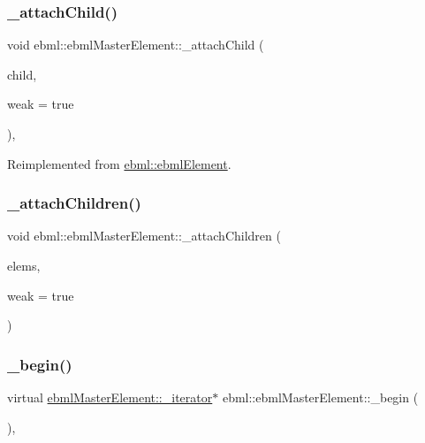 \subsubsection{\texorpdfstring{\+\_\+attach\+Child()}{\_attachChild()}}
{\footnotesize\ttfamily void ebml\+::ebml\+Master\+Element\+::\+\_\+attach\+Child (\begin{DoxyParamCaption}\item[{const \mbox{\hyperlink{namespaceebml_adad533b7705a16bb360fe56380c5e7be}{ebml\+Element\+\_\+sp}} \&}]{child,  }\item[{bool}]{weak = {\ttfamily true} }\end{DoxyParamCaption})\hspace{0.3cm}{\ttfamily [protected]}, {\ttfamily [virtual]}}



Reimplemented from \mbox{\hyperlink{classebml_1_1ebmlElement_aadc63457f069b5bcdbd81ee8a9801979}{ebml\+::ebml\+Element}}.

\mbox{\label{classebml_1_1ebmlMasterElement_ad4a20efe80537fde72af4584f67fb645}} 
\subsubsection{\texorpdfstring{\+\_\+attach\+Children()}{\_attachChildren()}}
{\footnotesize\ttfamily void ebml\+::ebml\+Master\+Element\+::\+\_\+attach\+Children (\begin{DoxyParamCaption}\item[{const \mbox{\hyperlink{namespaceebml_a1ddadd26791f273d851882653b9caf70}{ebml\+Element\+\_\+l}} \&}]{elems,  }\item[{bool}]{weak = {\ttfamily true} }\end{DoxyParamCaption})\hspace{0.3cm}{\ttfamily [protected]}}

\mbox{\label{classebml_1_1ebmlMasterElement_af6fb7a9934e9b8d0c64273ef6944f44b}} 
\subsubsection{\texorpdfstring{\+\_\+begin()}{\_begin()}}
{\footnotesize\ttfamily virtual \mbox{\hyperlink{classebml_1_1ebmlMasterElement_1_1__iterator}{ebml\+Master\+Element\+::\+\_\+iterator}}$\ast$ ebml\+::ebml\+Master\+Element\+::\+\_\+begin (\begin{DoxyParamCaption}{ }\end{DoxyParamCaption})\hspace{0.3cm}{\ttfamily [protected]}, {}}



